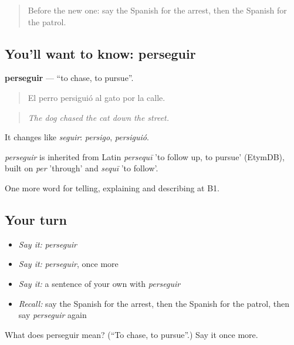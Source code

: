 \begin{quote}
Before the new one: say the Spanish for the arrest, then the Spanish for the patrol.
\end{quote}

\subsection*{You'll want to know: perseguir}
\textbf{perseguir} — \textquotedblleft{}to chase, to pursue\textquotedblright{}.

\begin{quote}
El perro persiguió al gato por la calle.
\end{quote}

\begin{quote}
\emph{The dog chased the cat down the street.}
\end{quote}

It changes like \emph{seguir}: \emph{persigo}, \emph{persiguió}.

\begin{cousinweb}
\emph{perseguir} is inherited from Latin \emph{persequī} 'to follow up, to pursue' (EtymDB), built on \emph{per} 'through' and \emph{sequī} 'to follow'.
\end{cousinweb}

\begin{grammarlens}[title={What you've built}]
One more word for telling, explaining and describing at B1.
\end{grammarlens}

\subsection*{Your turn}
\begin{itemize}
\raggedright
  \item \emph{Say it:} \emph{perseguir}
  \item \emph{Say it:} \emph{perseguir}, once more
  \item \emph{Say it:} a sentence of your own with \emph{perseguir}
  \item \emph{Recall:} say the Spanish for the arrest, then the Spanish for the patrol, then say \emph{perseguir} again
\end{itemize}

\begin{tcolorbox}[breakable,colback=teal!4,colframe=teal!35!black,title={Before you move on}]
What does perseguir mean? (\textquotedblleft{}To chase, to pursue\textquotedblright{}.) Say it once more.
\end{tcolorbox}
